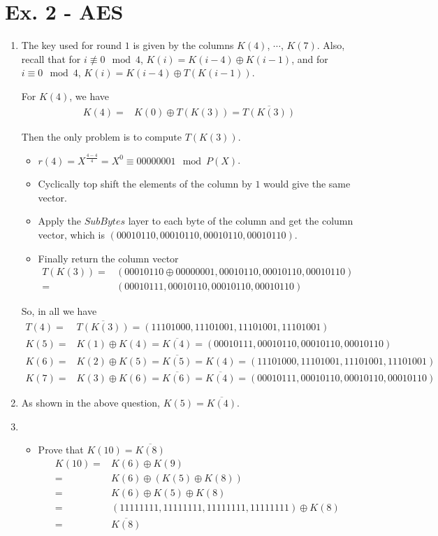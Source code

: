 \documentclass[11pt,a4paper]{article}
\begin{document}
\newpage
\section*{Ex. 2 - AES}
\begin{enumerate}
\item The key used for round $1$ is given by the columns $K(4)$, $\cdots$, $K(7)$. Also, recall that for $i \not\equiv 0 \mod 4$, $K(i) = K(i-4) \oplus K(i-1)$, and for $i \equiv 0 \mod 4$, $K(i) = K(i-4) \oplus T(K(i-1))$.
\par For $K(4)$, we have
\begin{align*}
	K(4) =& K(0) \oplus T(K(3)) = \overline{T(K(3))}
\end{align*}
\par Then the only problem is to compute $T(K(3))$.
\begin{itemize}
	\item $r(4) = X^{\frac{4-4}{4}} = X^{0} \equiv  00000001 \mod P(X)$.
	\item Cyclically top shift the elements of the column by $1$ would give the same vector.
	\item Apply the $\mathit{SubBytes}$ layer to each byte of the column and get the column vector, which is $(00010110, 00010110, 00010110, 00010110)$.
	\item Finally return the column vector
	\begin{align*}
		T(K(3)) =& (00010110 \oplus 00000001, 00010110, 00010110, 00010110) \\
		=& (00010111, 00010110, 00010110, 00010110)
	\end{align*}
\end{itemize}
\par So, in all we have
\begin{align*}
	T(4) =& \overline{T(K(3))} = (11101000, 11101001, 11101001, 11101001) \\
	K(5) =& K(1) \oplus K(4) = \overline{K(4)} = (00010111, 00010110, 00010110, 00010110) \\
	K(6) =& K(2) \oplus K(5) = \overline{K(5)} = K(4) = (11101000, 11101001, 11101001, 11101001) \\ 
	K(7) =& K(3) \oplus K(6) = \overline{K(6)} = \overline{K(4)} = (00010111, 00010110, 00010110, 00010110)
\end{align*}

\item As shown in the above question, $K(5) = \overline{K(4)}$.

\item \begin{itemize}
\item Prove that $K(10) = \overline{K(8)}$
\begin{align*}
	K(10) =& K(6) \oplus K(9) \\
	=& K(6) \oplus (K(5) \oplus K(8)) \\
	=& K(6) \oplus K(5) \oplus K(8) \\
	=& (11111111, 11111111, 11111111, 11111111) \oplus K(8) \\
	=& \overline{K(8)}
\end{align*}


\end{itemize}
\end{enumerate}
\end{document}
